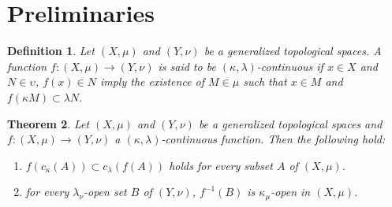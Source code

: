 \documentclass{matua}
\newtheorem{theorem}{Theorem}[section]
\newtheorem{definition}[theorem]{Definition}
\begin{document}
\section{Preliminaries}
\begin{definition}\cite{cs3}
Let $(X, \mu)$ and  $(Y, \nu)$ be a generalized topological spaces. A function $f: (X, \mu)\rightarrow (Y, \nu)$ is said to be $(\kappa, \lambda)$-continuous if $x\in X$ and $N\in \upsilon$, $f(x)\in N$ imply the existence of $M\in \mu$ such that $x\in M$ and $f(\kappa M)\subset \lambda N$.
\end{definition}
\begin{theorem}\label{t4.2}\cite{cs3}
Let $(X, \mu)$ and  $(Y, \nu)$ be a generalized topological spaces and $f: (X, \mu)\rightarrow (Y, \nu)$ a $(\kappa, \lambda)$-continuous function. Then the following hold:
\begin{enumerate}
\item  $f(c_\kappa(A))\subset c_{\lambda}(f(A))$ holds for every subset $A$ of $(X, \mu)$.
\item  for every $\lambda_\nu$-open set $B$ of $(Y, \nu)$, $f^{-1}(B)$ is $\kappa_\mu$-open in $(X, \mu)$.
\end{enumerate}
\end{theorem}
\end{document}
